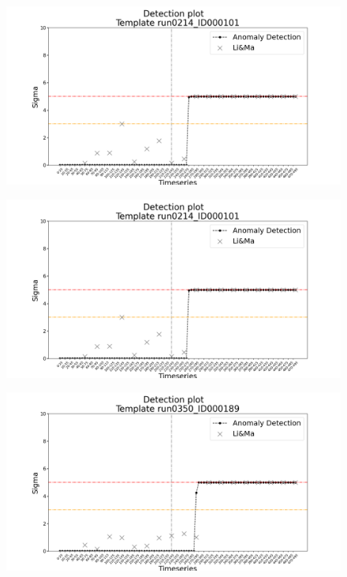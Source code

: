 \begin{figure}[!htb]    
    \includegraphics[width=1\textwidth]{figures/experiments/detection_plots/detection_plot_run0214_ID000101_testset_e.png}
\end{figure}
    
\begin{figure}[!htb]
    \includegraphics[width=1\textwidth]{figures/experiments/detection_plots/detection_plot_run0214_ID000101_testset_e.png}
\end{figure}

\begin{figure}[!htb]
    \includegraphics[width=1\textwidth]{figures/experiments/detection_plots/detection_plot_run0350_ID000189_testset_e.png}
\end{figure}


